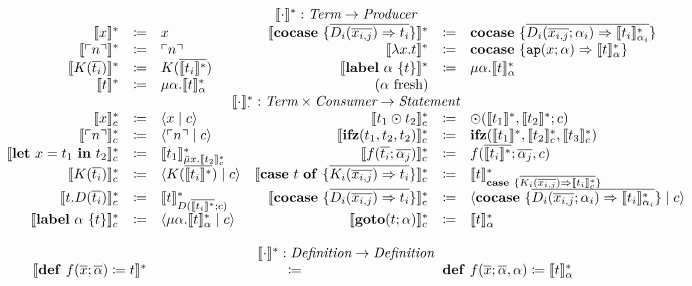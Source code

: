 \[
  \begin{array}{rcl rcl}
    \multicolumn{6}{c}{\translatestar{\cdot}{} : \emph{Term} \rightarrow  \emph{Producer}}\\
    \translatestar{x}{} & \coloneqq & x & 
    \translatestar{\cocase{\overline{D_i(\overline{x_{i,j}}) \Rightarrow t_i}}}{} & \coloneq & \cocase{\overline{D_i(\overline{x_{i,j}}; \alpha_i) \Rightarrow \translatestar{t_i}{\alpha_i}}} \\
    \translatestar{\lit{n}}{} & \coloneqq & \lit{n}  &
    \translatestar{\lambda x.t}{} & \coloneq & \cocase{\mathtt{ap}(x; \alpha) \Rightarrow \translatestar{t}{\alpha}} \\
    \translatestar{K(\overline{t_i})}{} & \coloneqq & K(\overline{\translatestar{t_i}{}}) &
    \translatestar{\lab{\alpha}{t}}{} & \coloneq & \mu \alpha.\translatestar{t}{\alpha}{} \\
    \translatestar{t}{} & \coloneqq & \mu\alpha.\translatestar{t}{\alpha} & \fresh{\alpha} &
    \\
    \multicolumn{6}{c}{\translatestar{\cdot}{\cdot} : \emph{Term} \times \emph{Consumer} \rightarrow \emph{Statement}}\\
    \translatestar{x}{c} & \coloneq & \cut{x}{c} & 
    \translatestar{t_1 \odot t_2}{c} & \coloneq & \odot(\translatestar{t_1}{}, \translatestar{t_2}{}; c)  \\
    \translatestar{\lit{n}}{c} & \coloneq & \cut{\lit{n}}{c} & 
    \translatestar{\ifz{t_1}{t_2}{t_2}}{c} & \coloneq & \ifz{\translatestar{t_1}{}}{\translatestar{t_2}{c}}{\translatestar{t_3}{c}}  \\
    \translatestar{\letin{x}{t_1}{t_2}}{c} & \coloneq & \translatestar{t_1}{\tilde{\mu}x.\translatestar{t_2}{c}} & 
    \translatestar{f(\overline{t_i}; \overline{\alpha_j})}{c} & \coloneq & f(\overline{\translatestar{t_i}{}}; \overline{\alpha_j}, c) \\
    \translatestar{K(\overline{t_i})}{c} & \coloneq & \cut{K(\overline{\translatestar{t_i}{}})}{c} & 
    \translatestar{\caseof{t}{\overline{K_i(\overline{x_{i,j}}) \Rightarrow t_i}}}{c} & \coloneq & \translatestar{t}{\case{\overline{K_i(\overline{x_{i,j}}) \Rightarrow \translatestar{t_i}{c}}}} \\
    \translatestar{t.D(\overline{t_i})}{c} & \coloneq & \translatestar{t}{D(\overline{\translatestar{t_i}{}}; c)} &
    \translatestar{\cocase{\overline{D_i(\overline{x_{i,j}}) \Rightarrow t_i}}}{c} & \coloneq & \cut{\cocase{\overline{D_i(\overline{x_{i,j}}; \alpha_i) \Rightarrow \translatestar{t_i}{\alpha_i}}}}{c}  \\
    \translatestar{\lab{\alpha}{t}}{c} & \coloneq & \cut{\mu \alpha.\translatestar{t}{\alpha}}{c} & 
    \translatestar{\goto{t}{\alpha}}{c} & \coloneq & \translatestar{t}{\alpha} \\
    \\
    \multicolumn{6}{c}{\translatestar{\cdot}{} : \emph{Definition} \rightarrow \emph{Definition}}\\
    \multicolumn{2}{r}{\translatestar{\defi{f(\overline{x}; \overline{\alpha})}{t}}{}} & \multicolumn{2}{c}{\coloneq} & \multicolumn{2}{l}{\defi{f(\overline{x}; \overline{\alpha}, \alpha)}{\translatestar{t}{\alpha}}} 
  \end{array}
\]
